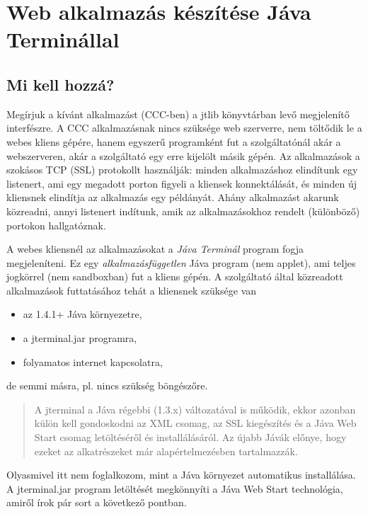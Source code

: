 
\section{Web alkalmazás készítése Jáva Terminállal}


\subsection{Mi kell hozzá?}
 
Megírjuk a kívánt alkalmazást (CCC-ben) a jtlib könyvtárban 
levő megjelenítő interfészre. 
A CCC alkalmazásnak nincs szüksége web szerverre,
nem töltődik le a webes kliens gépére, 
hanem egyszerű programként fut a szolgáltatónál akár a webszerveren, 
akár a szolgáltató egy  erre kijelölt másik gépén.
Az alkalmazások a szokásos TCP (SSL) protokollt használják:
minden alkalmazáshoz elindítunk egy listenert, 
ami egy megadott porton figyeli  a kliensek konnektálását,
és minden új kliensnek elindítja az alkalmazás egy példányát.
Ahány alkalmazást akarunk közreadni, annyi listenert indítunk,
amik az alkalmazásokhoz rendelt (különböző) portokon hallgatóznak.

A webes kliensnél az alkalmazásokat a {\em Jáva Terminál\/} 
program fogja megjeleníteni. Ez egy {\em alkalmazásfüggetlen\/} 
Jáva program (nem applet), ami teljes jogkörrel (nem sandboxban)
fut a kliens gépén.  A szolgáltató által közreadott alkalmazások
futtatásához tehát a kliensnek szüksége van 
\begin{itemize}
\item  
   az 1.4.1+ Jáva környezetre,
\item  
   a jterminal.jar programra,
\item 
   folyamatos internet kapcsolatra,   
\end{itemize}
de semmi másra, pl. nincs szükség böngészőre.

\begin{quote}\small
A jterminal a Jáva régebbi (1.3.x) változatával is működik, 
ekkor azonban külön kell gondoskodni az XML csomag,
az SSL kiegészítés és a Jáva Web Start csomag letöltéséről és installálásáról. 
Az újabb Jávák előnye, hogy ezeket az alkatrészeket már 
alapértelmezésben tartalmazzák. 
\end{quote}

Olyasmivel itt nem foglalkozom, mint a Jáva környezet 
automatikus installálása. A jterminal.jar program letöltését
megkönnyíti a Jáva Web Start technológia, amiről
írok pár sort a következő pontban.


